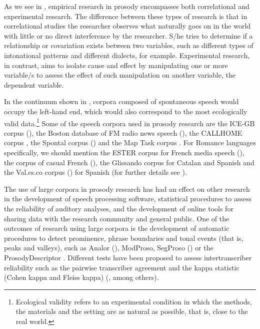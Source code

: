 \documentclass[output=paper]{LSP/langsci}
\begin{document}
As we see in , empirical research in prosody encompasses both correlational and experimental research. The difference between these types of research is that in correlational studies the researcher observes what naturally goes on in the world with little or no direct interference by the researcher. S/he tries to determine if a relationship or covariation exists between two variables, such as different types of intonational patterns and different dialects, for example. Experimental research, in contrast, aims to isolate cause and effect by manipulating one or more variable/s to assess the effect of such manipulation on another variable, the dependent variable. 

In the continuum shown in , corpora composed of spontaneous speech would occupy the left-hand end, which would also correspond to the most ecologically valid data.\footnote{Ecological validity refers to an experimental condition in which the methods, the materials and the setting are as natural as possible, that is, close to the real world.} Some of the speech corpora used in prosody research are the ICE-GB corpus (\citealt{Wichmann2003}), the Boston database of FM radio news speech (\citealt{Ostendorf1995}), the CALLHOME corpus \citep{Ogden2006}, the Spontal corpus (\citealt{Edlund2010}) and the Map Task corpus \citep{Anderson1991}. For Romance languages specifically, we should mention the ESTER corpus for French media speech (\citealt{Gravier2004}), the corpus of casual French (\citealt{Torreira2010}), the Glissando corpus \citep{Garrido2013Glissando} for Catalan and Spanish and the Val.es.co corpus (\citealt{CabedoNebot2013ValEsCo}) for Spanish (for further details see \citealt{Delais-Roussarie2008,Post2012,Delais-Roussarie2014}). 

The use of large corpora in prosody research has had an effect on other research in the development of speech processing software, statistical procedures to assess the reliability of auditory analyses, and the development of online tools for sharing data with the research community and general public. One of the outcomes of research using large corpora is the development of automatic procedures to detect prominence, phrase boundaries and tonal events (that is, peaks and valleys), such as Analor (\citealt{Avanzi2010}), ModProso, SegProso (\citealt{Garrido2013ModProso,Garrido2013SegProso}) or the ProsodyDescriptor \citep{Barbosa2013}. Different tests have been proposed to assess intertranscriber reliability such as the pairwise transcriber agreement and the kappa statistic (Cohen kappa and Fleiss kappa)  (\citealt{Brennan1981,Yoon2004,Randolph2008,Mo2008,Escudero2012}, among others). 
\end{document}
